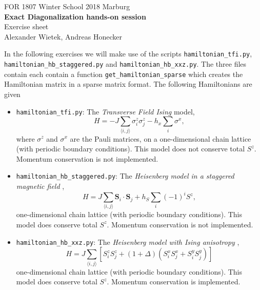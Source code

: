 \documentclass[]{article}
\theoremstyle{definition}
\begin{document}
\begin{center}
  {FOR 1807 Winter School 2018 Marburg}\\
  \textbf{Exact Diagonalization hands-on
    session}\\ %
  Exercise sheet\\
  Alexander Wietek, Andreas Honecker%
\end{center}

\vspace{0.2 cm}

In the following exercises we will make use of the scripts
\texttt{hamiltonian\_tfi.py}, \texttt{hamiltonian\_hb\_staggered.py}
and \texttt{hamiltonian\_hb\_xxz.py}.  The three files contain each
contain a function \texttt{get\_hamiltonian\_sparse} which creates the
Hamiltonian matrix in a sparse matrix format. The following
Hamiltonians are given
\begin{itemize}
\item \texttt{hamiltonian\_tfi.py}: The \textit{Transverse Field
    Ising} model,
  \begin{equation}
    \label{eq:tfi}
    H = -J\sum\limits_{\langle i , j \rangle} \sigma^z_i\sigma^z_j - h_x \sum\limits_{i}\sigma^x,
  \end{equation}
  where $\sigma^z$ and $\sigma^x$ are the Pauli matrices, on a
  one-dimensional chain lattice (with periodic boundary conditions).
  This model does not conserve total $S^z$. Momentum conservation is
  not implemented.
\item \texttt{hamiltonian\_hb\_staggered.py}: The \textit{Heisenberg
    model in a staggered magnetic field} ,
  \begin{equation}
    \label{eq:hb_stag}
    H = J\sum\limits_{\langle i , j \rangle} \mathbf{S}_i\cdot\mathbf{S}_j + h_S \sum\limits_{i}(-1)^iS^z,
  \end{equation}
  one-dimensional chain lattice (with periodic boundary conditions).
  This model does conserve total $S^z$. Momentum conservation is not
  implemented.
\item \texttt{hamiltonian\_hb\_xxz.py}: The \textit{Heisenberg model
    with Ising anisotropy} ,
  \begin{equation}
    \label{eq:hb_xxz}
    H = J\sum\limits_{\langle i , j \rangle} \left[S^z_iS^z_j +
      (1+\Delta)\left(S^x_iS^x_j + S^y_iS^y_j\right)\right]
  \end{equation}
  one-dimensional chain lattice (with periodic boundary conditions).
  This model does conserve total $S^z$. Momentum conservation is
  implemented.
\end{itemize}
\end{document}
